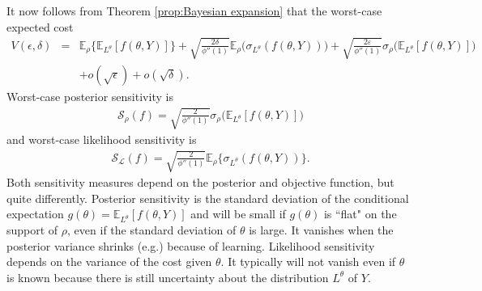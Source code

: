 \documentclass[11pt,reqno,letter]{amsart}
\theoremstyle{plain}
\theoremstyle{definition}
\numberwithin{equation}{section}
\numberwithin{theorem}{section}
\numberwithin{table}{section}
\numberwithin{figure}{section}
\begin{document}
It now  follows from Theorem \ref{prop:Bayesian expansion} that the worst-case expected cost 
\begin{eqnarray*}
V(\epsilon, \delta) %
& = &  {\mathbb E}_\rho\Big\{{\mathbb E}_{L^\theta}[f(\theta, Y)]\Big\}+ \sqrt{\frac{2\delta}{\phi''(1)}}{\mathbb E}_\rho \Big({\sigma}_{L^\theta}(f(\theta, Y))\Big) + \sqrt{\frac{2\varepsilon}{\phi''(1)}}
{\sigma}_\rho\Big({\mathbb E}_{L^\theta}[f(\theta, Y)]\Big) \nonumber \\
& & + o(\sqrt{\epsilon}) + o(\sqrt{\delta}).
\end{eqnarray*}
Worst-case posterior  sensitivity is
\begin{eqnarray}
{\mathcal S}_\rho(f) %
= \sqrt{\frac{2}{\phi''(1)}}{\sigma}_\rho\Big({\mathbb E}_{L^\theta}[f(\theta, Y)]\Big)
\label{eq:prior-sensitivity-const}
\end{eqnarray}
and worst-case likelihood sensitivity is %
\begin{eqnarray}
{\mathcal S}_{\mathcal L}(f) %
= \sqrt{\frac{2}{\phi''(1)}} {\mathbb E}_\rho \Big\{{\sigma}_{L^\theta}(f(\theta, Y))\Big\}.
\label{eq:likelihood-sensitivity-const}
\end{eqnarray}
Both sensitivity measures depend on the posterior and objective function, but quite differently. Posterior sensitivity  is the standard deviation of the conditional expectation $g(\theta) = {\mathbb E}_{L^\theta}[f(\theta, Y)]$ and will be small if $g(\theta)$ is ``flat" on the support of $\rho$, even if the standard deviation of $\theta$ is large. 
It vanishes when the posterior variance shrinks (e.g.) because of learning. Likelihood sensitivity depends on the variance of the cost given $\theta$. It typically will not vanish even if $\theta$ is known because there is still uncertainty about the distribution $L^\theta$ of $Y$.
\end{document}
